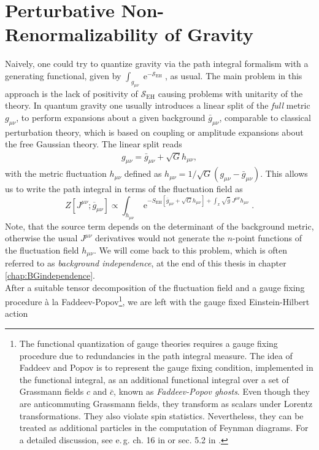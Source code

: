 \section{Perturbative Non-Renormalizability of Gravity}
Naively, one could try to quantize gravity via the path integral formalism with a generating functional, given by $\int_{g_{\mu\nu}} \operatorname{e}^{-\mathcal{S}_{\mathrm{EH}}}$, as usual. The main problem in this approach is the lack of positivity of $\mathcal{S}_{\mathrm{EH}}$ causing problems with unitarity of the theory. In quantum gravity one usually introduces a linear split of the \textit{full} metric $g_{\mu\nu}$, to perform expansions about a given background $\bar{g}_{\mu\nu}$, comparable to classical perturbation theory, which is based on coupling or amplitude expansions about the free Gaussian theory. The linear split reads
\begin{align}
	g_{\mu\nu} = \bar{g}_{\mu\nu} + \sqrt{G}h_{\mu\nu},
\end{align}
with the metric fluctuation $h_{\mu\nu}$ defined as $h_{\mu\nu}= 1/\sqrt{G}\left(g_{\mu\nu}-\bar{g}_{\mu\nu}\right)$. This allows us to write the path integral in terms of the fluctuation field as
\begin{equation}
Z\left[J^{\mu \nu} ; \overline{g}_{\mu \nu}\right] \propto \int_{h_{\mu \nu}} \operatorname{e}^{-S_{\mathrm{EH}}\left[\overline{g}_{\mu \nu}+\sqrt{G} h_{\mu \nu}\right]+\int_x \sqrt{\bar{g}} \  J^{\mu \nu} h_{\mu \nu}}.
\end{equation}
Note, that the source term depends on the determinant of the background metric, otherwise the usual $J^{\mu\nu}$ derivatives would not generate the $n$-point functions of the fluctuation field $h_{\mu\nu}$. We will come back to this problem, which is often referred to as \textit{background independence}, at the end of this thesis in chapter \ref{chap:BGindependence}. \\
After a suitable tensor decomposition of the fluctuation field and a gauge fixing procedure \`a la Faddeev-Popov\footnote{The functional quantization of gauge theories requires a gauge fixing procedure due to redundancies in the path integral measure. The idea of Faddeev and Popov is to represent the gauge fixing condition, implemented in the functional integral, as an additional functional integral over a set of Grassmann fields $c$ and $\bar{c}$, known as \textit{Faddeev-Popov ghosts}. Even though they are anticommuting Grassmann fields, they transform as scalars under Lorentz transformations. They also violate spin statistics. Nevertheless, they can be treated as additional particles in the computation of Feynman diagrams. For a detailed discussion, see e.\,g. ch. 16 in \cite{PeskinSchroeder1995} or  sec. 5.2 in \cite{PawlowskiNPgaugeLecture}.},  we are left with the gauge fixed Einstein-Hilbert action
